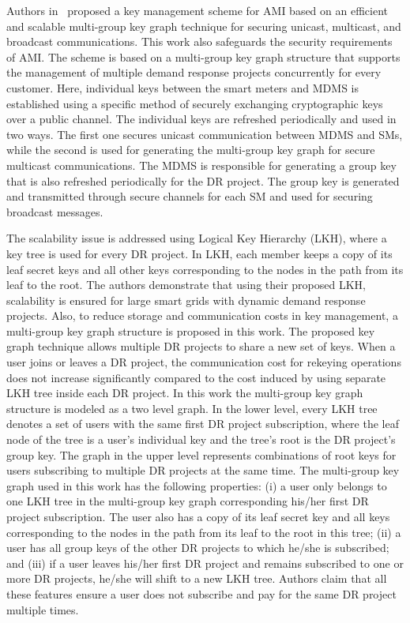 \par Authors in~\cite{Benmalek2015} proposed a key management scheme for AMI based on an efficient and scalable multi-group key graph technique for securing unicast, multicast, and broadcast communications. This work also safeguards the security requirements of AMI. The scheme is based on a multi-group key graph structure that supports the management of multiple demand response projects concurrently for every customer. Here, individual keys between the smart meters and MDMS is established using a specific method of securely exchanging cryptographic keys over a public channel. The individual keys are refreshed periodically and used in two ways. The first one secures unicast communication between MDMS and SMs, while the second is used for generating the multi-group key graph for secure multicast communications. The MDMS is responsible for generating a group key that is also refreshed periodically for the DR project. The group key is generated and transmitted through secure channels for each SM and used for securing broadcast messages. 
\par The scalability issue is addressed using Logical Key Hierarchy (LKH), where a key tree is used for every DR project. In LKH, each member keeps a copy of its leaf secret keys and all other keys corresponding to the nodes in the path from its leaf to the root. The authors demonstrate that using their proposed LKH, scalability is ensured for large smart grids with dynamic demand response projects. Also, to reduce storage and communication costs in key management, a multi-group key graph structure is proposed in this work. The proposed key graph technique allows multiple DR projects to share a new set of keys. When a user joins or leaves a DR project, the communication cost for rekeying operations does not increase significantly compared to the cost induced by using separate LKH tree inside each DR project. In this work the multi-group key graph structure is modeled as a two level graph. In the lower level, every LKH tree denotes a set of users with the same first DR project subscription, where the leaf node of the tree is a user's individual key and the tree's root is the DR project's group key. The graph in the upper level represents combinations of root keys for users subscribing to multiple DR projects at the same time. The multi-group key graph used in this work has the following properties: (i) a user only belongs to one LKH tree in the multi-group key graph corresponding his/her first DR project subscription. The user also has a copy of its leaf secret key and all keys corresponding to the nodes in the path from its leaf to the root in this tree; (ii) a user has all group keys of the other DR projects to which he/she is subscribed; and (iii) if a user leaves his/her first DR project and remains subscribed to one or more DR projects, he/she will shift to a new LKH tree. Authors claim that all these features ensure a user does not subscribe and pay for the same DR project multiple times.

